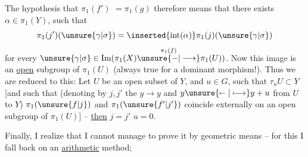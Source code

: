 The hypothesis that $\pi_1(f')$  $=\pi_1(g)$ therefore means that there exists $\alpha\in\pi_1(Y)$, such that
\[
\pi_1(j')(\unsure{\gamma|\sigma})=\inserted{\operatorname{int}(\alpha)}\pi_1(j)(\unsure{\gamma|\sigma})
\]
for every $\unsure{\gamma|\sigma}\in\operatorname{Im}(\pi_1(X)\overset{\pi_1(f)}{\unsure{-|\longrightarrow}}\pi_1(U))$. Now this image is an \uline{open} subgroup of $\pi_1(U)$ (always true for a dominant morphism!).  Thus we are reduced to this: Let $U$ be an open \inserted{$\ne\varnothing$} subset of $Y$, and $u\in G$, such that $\tau_uU\subset Y$ [and such that (denoting by $j,j'$ the   $y\longrightarrow y$ and $y\unsure{\mapstochar\relbar|\longmapsto}y+u$ from $U$ to $Y$) $\pi_1(\unsure{f|j})$ and $\pi_1(\unsure{f'|j'})$ coincide externally on an open subgroup of $\pi_1(U)$] -- \uline{then} $j=j'$  $u=0$.


Finally, I realize that I cannot manage to prove it by geometric means -- for this I fall back on an \uline{arithmetic} method;

